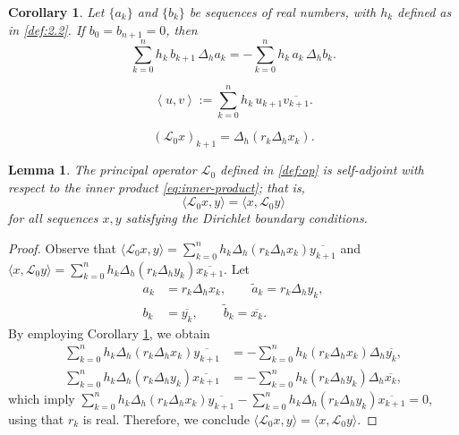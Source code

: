 \documentclass[10pt,a4paper]{amsart}
\newtheorem{cor}{Corollary}
\newtheorem{lem}{Lemma}
\begin{document}
\begin{cor}
\label{cor:summation}
Let $\{a_k\}$ and $\{b_k\}$ be sequences of real numbers, with $h_k$ defined as in \eqref{def:2.2}. If $b_0 = b_{n+1} = 0$, then
\[
\sum_{k=0}^{n} h_k\, b_{k+1}\, \Delta_h a_k = -\sum_{k=0}^{n} h_k\, a_k\, \Delta_h b_k.
\]
\end{cor}

\begin{equation}
\label{eq:inner-product}
\left\langle u,v\right\rangle := \sum_{k=0}^{n} h_k\, u_{k+1} \overline{v_{k+1}}.
\end{equation}

\begin{equation}
    \label{def:op}
    (\mathcal{L}_0 x)_{k+1} = \Delta_h(r_k \Delta_h x_k).
\end{equation}

\begin{lem}
\label{lem:opL0}
The principal operator $\mathcal{L}_0$ defined in \eqref{def:op} is self-adjoint with respect to the inner product \eqref{eq:inner-product}; that is,
\[
\langle \mathcal{L}_0 x, y \rangle = \langle x, \mathcal{L}_0 y \rangle
\]
for all sequences $x, y$ satisfying the Dirichlet boundary conditions.
\end{lem}

\begin{proof}
Observe that $\langle \mathcal{L}_0x,y \rangle = \displaystyle\sum_{k=0}^{n}h_k\Delta_h(r_k \Delta_h x_{k})\overline{y_{k+1}}$ and $\langle x,\mathcal{L}_0y \rangle = \displaystyle\sum_{k=0}^{n}h_k\Delta_h(r_k \Delta_h y_{k})\overline{x_{k+1}}$. Let 
\begin{align*}
a_k &= r_k\Delta_h x_k,  \qquad \widetilde{a}_k = r_k\Delta_h y_k,\\
b_k &= \overline{y_k}, \qquad \widetilde{b}_k=\overline{x_k}.
\end{align*}
By employing Corollary \ref{cor:summation}, we obtain
\begin{align*}
    \displaystyle\sum_{k=0}^{n}h_k\Delta_h(r_k\Delta_hx_k)\overline{y_{k+1}} &= -\displaystyle\sum_{k=0}^{n}h_k(r_k\Delta_hx_k)\Delta_h\overline{y_k},\\
     \displaystyle\sum_{k=0}^{n}h_k\Delta_h(r_k\Delta_hy_k)\overline{x_{k+1}} &= -\displaystyle\sum_{k=0}^{n}h_k(r_k\Delta_hy_k)\Delta_h\overline{x_k},
\end{align*}
which imply $\displaystyle\sum_{k=0}^{n}h_k\Delta_h(r_k \Delta_h x_{k})\overline{y_{k+1}}-\displaystyle\sum_{k=0}^{n}h_k\Delta_h(r_k \Delta_h y_{k})\overline{x_{k+1}}=0$, using that $r_k$ is real. Therefore, we conclude $\langle \mathcal{L}_0x,y \rangle= \langle x,\mathcal{L}_0y \rangle$.
\end{proof}
\end{document}

